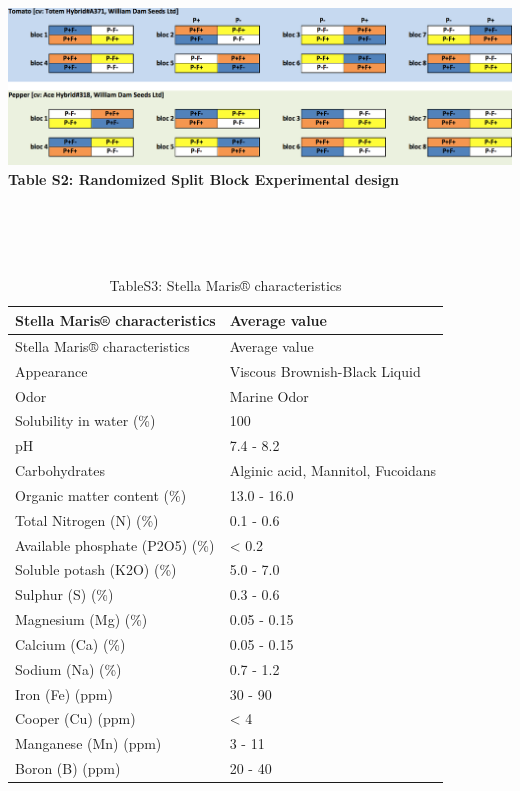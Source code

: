 \documentclass[11pt,]{article}
\begin{document}
~\\
\hspace*{0.333em}\\
\hspace*{0.333em}\\
\newpage    \includegraphics[width=6.77083in]{../figures/Figure1.png}\\
\textbf{Table S2: Randomized Split Block Experimental design}

~\\
\hspace*{0.333em}\\
\hspace*{0.333em}\\
\newpage   

\begin{longtable}[]{@{}ll@{}}
\caption{TableS3: Stella Maris® characteristics}\tabularnewline
\toprule
Stella Maris® characteristics & Average value\tabularnewline
\midrule
\endfirsthead
\toprule
Stella Maris® characteristics & Average value\tabularnewline
\midrule
\endhead
Appearance & Viscous Brownish-Black Liquid\tabularnewline
Odor & Marine Odor\tabularnewline
Solubility in water (\%) & 100\tabularnewline
pH & 7.4 - 8.2\tabularnewline
Carbohydrates & Alginic acid, Mannitol, Fucoidans\tabularnewline
Organic matter content (\%) & 13.0 - 16.0\tabularnewline
Total Nitrogen (N) (\%) & 0.1 - 0.6\tabularnewline
Available phosphate (P2O5) (\%) & \textless{} 0.2\tabularnewline
Soluble potash (K2O) (\%) & 5.0 - 7.0\tabularnewline
Sulphur (S) (\%) & 0.3 - 0.6\tabularnewline
Magnesium (Mg) (\%) & 0.05 - 0.15\tabularnewline
Calcium (Ca) (\%) & 0.05 - 0.15\tabularnewline
Sodium (Na) (\%) & 0.7 - 1.2\tabularnewline
Iron (Fe) (ppm) & 30 - 90\tabularnewline
Cooper (Cu) (ppm) & \textless{} 4\tabularnewline
Manganese (Mn) (ppm) & 3 - 11\tabularnewline
Boron (B) (ppm) & 20 - 40\tabularnewline
\bottomrule
\end{longtable}

~\\
\hspace*{0.333em}\\
\hspace*{0.333em}\\
\newpage 
\end{document}
